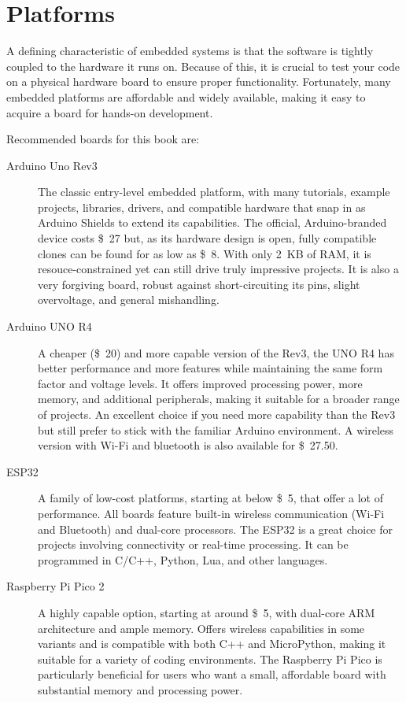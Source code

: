 \section{Platforms}
\label{sec:platforms}
A defining characteristic of embedded systems is that the software is tightly coupled to the hardware it runs on.
Because of this, it is crucial to test your code on a physical hardware board to ensure proper functionality. Fortunately, many embedded platforms are affordable and widely available, making it easy to acquire a board for hands-on development.

Recommended boards for this book are:
\begin{description}
\item[Arduino Uno Rev3]
  The classic entry-level embedded platform, with many tutorials, example projects, libraries, drivers, and compatible hardware that snap in as Arduino Shields to extend its capabilities.
  The official, Arduino-branded device costs \SI{27}[\$]{} but, as its hardware design is open, fully compatible clones can be found for as low as \SI{8}[\$]{}.
  With only \SI{2}{KB} of RAM, it is resouce-constrained yet can still drive truly impressive projects.
  It is also a very forgiving board, robust against short-circuiting its pins, slight overvoltage, and general mishandling.
\item[Arduino UNO R4]
  A cheaper (\SI{20}[\$]{}) and more capable version of the Rev3, the UNO R4 has better performance and more features while maintaining the same form factor and voltage levels.
  It offers improved processing power, more memory, and additional peripherals, making it suitable for a broader range of projects.
  An excellent choice if you need more capability than the Rev3 but still prefer to stick with the familiar Arduino environment.
  A wireless version with Wi-Fi and bluetooth is also available for \SI{27.50}[\$]{}.
\item[ESP32]
  A family of low-cost platforms, starting at below \SI{5}[\$]{}, that offer a lot of performance.
  All boards feature built-in wireless communication (Wi-Fi and Bluetooth) and dual-core processors.
  The ESP32 is a great choice for projects involving connectivity or real-time processing.
  It can be programmed in C/C++, Python, Lua, and other languages.
\item[Raspberry Pi Pico 2]
  A highly capable option, starting at around \SI{5}[\$]{}, with dual-core ARM architecture and ample memory.
  Offers wireless capabilities in some variants and is compatible with both C++ and MicroPython, making it suitable for a variety of coding environments.
  The Raspberry Pi Pico is particularly beneficial for users who want a small, affordable board with substantial memory and processing power.
\end{description}

